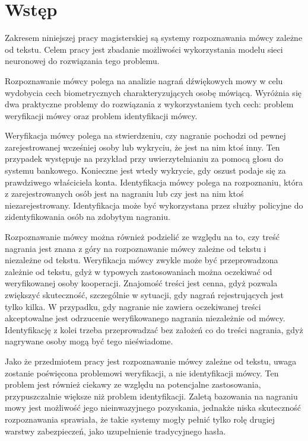 \chapter{Wstęp}\label{chap:wstep}

Zakresem niniejszej pracy magisterskiej są systemy rozpoznawania mówcy zależne od tekstu. Celem
pracy jest zbadanie możliwości wykorzystania modelu sieci neuronowej do rozwiązania tego problemu.

Rozpoznawanie mówcy polega na analizie nagrań dźwiękowych mowy w celu wydobycia cech biometrycznych
charakteryzujących osobę mówiącą. Wyróżnia się dwa praktyczne problemy do rozwiązania z wykorzystaniem tych
cech: problem weryfikacji mówcy oraz problem identyfikacji mówcy.

Weryfikacja mówcy polega na stwierdzeniu, czy nagranie pochodzi od pewnej zarejestrowanej wcześniej osoby
lub wykryciu, że jest na nim ktoś inny. Ten przypadek występuje na przykład przy uwierzytelnianiu za pomocą głosu
do systemu bankowego. Konieczne jest wtedy wykrycie, gdy oszust podaje się za prawdziwego właściciela konta.
Identyfikacja mówcy polega na rozpoznaniu, która z zarejestrowanych osób jest na nagraniu lub czy
jest na nim ktoś niezarejestrowany. Identyfikacja może być wykorzystana przez służby policyjne do
zidentyfikowania osób na zdobytym nagraniu.

Rozpoznawanie mówcy można również podzielić ze względu na to, czy treść nagrania jest znana z góry
na rozpoznawanie mówcy zależne od tekstu i niezależne od tekstu. Weryfikacja mówcy zwykle może
być przeprowadzona zależnie od tekstu, gdyż w typowych zastosowaniach można oczekiwać od weryfikowanej
osoby kooperacji. Znajomość treści jest cenna, gdyż pozwala zwiększyć skuteczność, szczególnie w sytuacji,
gdy nagrań rejestrujących jest tylko kilka\cite{parallelSpeakerAnd}. W przypadku,
gdy nagranie nie zawiera oczekiwanej treści
akceptowalne jest odrzucenie weryfikowanego nagrania niezależnie od mówcy.
Identyfikację z kolei trzeba przeprowadzać bez założeń co do treści nagrania, gdyż nagrywane osoby mogą
być tego nieświadome.

Jako że przedmiotem pracy jest rozpoznawanie mówcy zależne od tekstu, uwaga zostanie poświęcona problemowi
weryfikacji, a nie identyfikacji mówcy. Ten problem jest również ciekawy ze względu na potencjalne zastosowania,
przypuszczalnie większe niż problem identyfikacji. Zaletą bazowania na nagraniu mowy jest możliwość
jego nieinwazyjnego pozyskania, jednakże niska skuteczność rozpoznawania sprawiała, że takie systemy
mogły pełnić tylko rolę drugiej warstwy zabezpieczeń, jako uzupełnienie tradycyjnego hasła.

